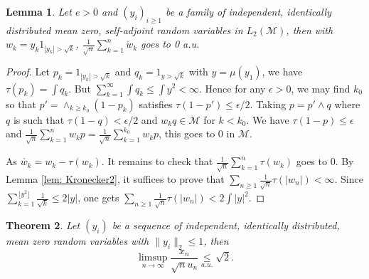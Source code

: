 \documentclass[10pt]{amsart}
\newtheorem{thm}{Theorem}[section]
\newtheorem{lem}[thm]{Lemma}
\theoremstyle{definition}
\theoremstyle{myremark}
\numberwithin{equation}{section}
\newcommand{\CM}{\mathcal{M}}
\begin{document}
  \begin{lem}\label{tail}
   Let $e>0$ and $(y_i)_{i\geq 1}$ be a family of independent, identically distributed mean zero,
    self-adjoint random variables in $L_2(\CM)$, then with $w_k=y_k1_{ |y_k|>\sqrt k}$, $\frac 1{\sqrt n}\sum_{k=1}^n \mathring w_k$ goes to 0 a.u.
      \end{lem}
      \begin{proof}
        Let $p_k=1_{ |y_k|>\sqrt k}$ and $q_k=1_{y>\sqrt k}$ with $y=\mu(y_1)$, we have
        $\tau(p_k)= \int q_k$. But $\sum_{k=1}^\infty \int q_k\leq \int y^2<\infty$. Hence for any $\epsilon>0$, we may find $k_0$ so that
        $p'=\wedge_{k\geq k_0}(1-p_k)$ satisfies $\tau(1-p')\leq \epsilon/2$. Taking $p=p'\wedge q$ where $q$ is such that $\tau(1-q)<\epsilon/2$ and $w_kq\in \CM$ for $k< k_0$. We have $\tau(1-p)\leq \epsilon$ and $\frac 1 {\sqrt n}\sum_{k=1}^n w_kp=\frac 1 {\sqrt n}\sum_{k=1}^{k_0} w_kp$, this goes to 0 in $\CM$.

        As $\mathring{w_k}=w_k-\tau (w_k)$. It remains to check that $\frac 1 {\sqrt n}\sum_{k=1}^n \tau(w_k)$ goes to 0. By  Lemma \ref{lem: Kronecker2}, it suffices to prove that $\sum_{n\geq 1} \frac 1 {\sqrt n}\tau(|w_n|)<\infty$. Since $\sum_{k=1}^{\lfloor { y^2}\rfloor} \frac 1{\sqrt k}\leq { 2}|y|$, one gets $\sum_{n\geq 1} \frac 1 {\sqrt n}\tau(|w_n|)<{2}\int |y|^2$.     
           \end{proof}


      \begin{thm}\label{thm: main them with independent rv}
  Let $(y_i)$ be a sequence of independent, identically distributed, mean zero 
  random variables with $\|y_i\|_2\leq 1$, then 
    $$ 
    \limsup_{n \to \infty} \frac{x_n}{\sqrt{n} u_n}  \underset{a.u.}{\leq }\sqrt{2}.
    $$
  \end{thm}
\end{document}
